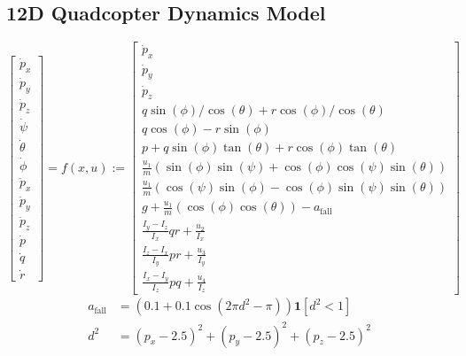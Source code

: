 \documentclass{l4dc2026}
\def\1{\bm{1}}
\begin{document}
\subsection{12D Quadcopter Dynamics Model}\label{app:quad_dyn}
\begin{equation}
\begin{bmatrix}
    \dot{p}_x \\
    \dot{p}_y \\
    \dot{p}_z \\
    \dot{\psi} \\
    \dot{\theta} \\
    \dot{\phi} \\
    \ddot{p}_x \\
    \ddot{p}_y \\
    \ddot{p}_z \\
    \dot{p} \\
    \dot{q} \\
    \dot{r}
\end{bmatrix}
= f(x,u) :=
\begin{bmatrix}
    \dot{p}_x \\
    \dot{p}_y \\
    \dot{p}_z \\
    q \sin(\phi)/\cos(\theta) + r \cos(\phi)/\cos(\theta) \\
    q \cos(\phi) - r \sin(\phi) \\
    p + q \sin(\phi)\tan(\theta) + r \cos(\phi)\tan(\theta) \\
    \frac{u_1}{m} (\sin(\phi)\sin(\psi) + \cos(\phi)\cos(\psi)\sin(\theta)) \\
    \frac{u_1}{m} (\cos(\psi)\sin(\phi) - \cos(\phi)\sin(\psi)\sin(\theta)) \\
    g + \frac{u_1}{m} (\cos(\phi)\cos(\theta)) -a_\text{fall}\\
    \frac{I_y - I_z}{I_x} qr + \frac{u_2}{I_x} \\
    \frac{I_z - I_x}{I_y} pr + \frac{u_3}{I_y} \\
    \frac{I_x - I_y}{I_z} pq + \frac{u_4}{I_z}
\end{bmatrix}
\end{equation}
\begin{align}
    a_\text{fall} &= \left(0.1 + 0.1\cos(2\pi d^2 -\pi)\right)\1[{d^2 < 1}]\\
    d^2 &= (p_x-2.5)^2 + (p_y-2.5)^2 + (p_z-2.5)^2
\end{align}
\end{document}
